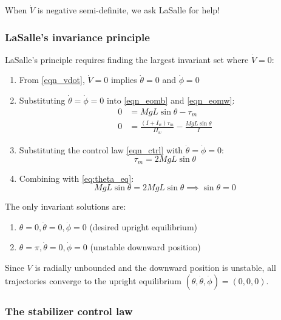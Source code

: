 \documentclass{article}
\begin{document}
When $\dot{V}$ is negative semi-definite, we ask LaSalle for help!

\subsubsection*{LaSalle's invariance principle}

LaSalle's principle requires finding the largest invariant set where $\dot{V} = 0$:

\begin{enumerate}
  \item From \eqref{eqn_vdot}, $\dot{V} = 0$ implies $\dot{\theta} = 0$ and $\dot{\phi} = 0$

  \item Substituting $\dot{\theta} = \dot{\phi} = 0$ into \eqref{eqn_eomb} and \eqref{eqn_eomw}:
  \begin{align}
    0 &= MgL\sin\theta - \tau_m \label{eq:theta_eq} \\
    0 &= \frac{(I + I_w)\tau_m}{I I_w} - \frac{MgL\sin\theta}{I} \label{eq:phi_eq}
  \end{align}

  \item Substituting the control law \eqref{eqn_ctrl} with $\dot{\theta} = \dot{\phi} = 0$:
  \begin{equation}
    \tau_m = 2MgL\sin\theta
  \end{equation}

  \item Combining with \eqref{eq:theta_eq}:
  \begin{equation}
      MgL\sin\theta = 2MgL\sin\theta \implies \sin\theta = 0
  \end{equation}
\end{enumerate}

The only invariant solutions are:
\begin{enumerate}
   \item$\theta=0,\dot{\theta}=0,\dot{\phi}=0$ (desired upright equilibrium)
   \item$\theta=\pi,\dot{\theta}=0,\dot{\phi}=0$ (unstable downward position)
\end{enumerate}

Since $V$ is radially unbounded and the downward position is unstable, all trajectories converge to the upright equilibrium $(\theta, \dot{\theta}, \dot{\phi}) = (0, 0, 0)$.

\subsubsection*{The stabilizer control law}
\end{document}
